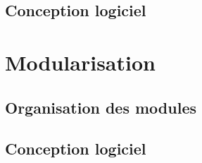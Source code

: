 \documentclass[a4paper,12pt]{article}
\begin{document}
    \clearpage
    \subsection{Conception logiciel}




    \section{Modularisation}
    \label{sec:module}

    \subsection{Organisation des modules}

    \clearpage
    \subsection{Conception logiciel}


\end{document}
